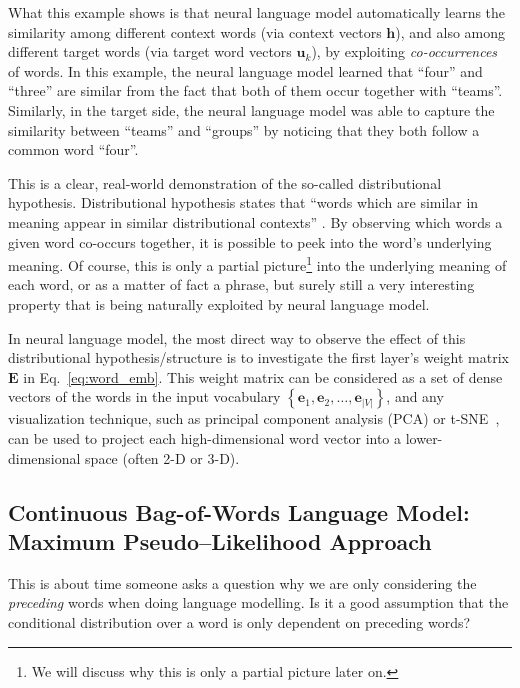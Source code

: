\documentclass{report}
\newcommand{\vect}[1]{\mathbf{#1}}
\newcommand{\matr}[1]{\mathbf{#1}}
\newcommand{\ve}[0]{\vect{e}}
\newcommand{\vh}[0]{\vect{h}}
\newcommand{\vu}[0]{\vect{u}}
\newcommand{\mE}[0]{\matr{E}}
\newcommand{\alert}[1]{\textcolor{red}{#1}}
\begin{document}
What this example shows is that neural language model automatically learns the
similarity among different context words (via context vectors $\vh$), and also among
different target words (via target word vectors $\vu_k$), by exploiting {\em
co-occurrences} of words. In this example, the neural language model learned
that ``four'' and ``three'' are similar from the fact that both of them occur
together with ``teams''. Similarly, in the target side, the neural language
model was able to capture the similarity between ``teams'' and ``groups'' by
noticing that they both follow a common word ``four''.

This is a clear, real-world demonstration of the so-called distributional
hypothesis. Distributional hypothesis states that ``words which are similar in
meaning appear in similar distributional contexts'' \cite{firth1957}. By
observing which words a given word co-occurs together, it is possible to peek
into the word's underlying meaning. Of course, this is only a partial
picture\footnote{
    We will discuss why this is only a partial picture later on.
}
into the underlying meaning of each word, or as a matter of fact a phrase, but
surely still a very interesting property that is being naturally exploited by
neural language model.

In neural language model, the most direct way to observe the effect of this
distributional hypothesis/structure is to investigate the first layer's weight
matrix $\mE$ in Eq.~\eqref{eq:word_emb}. This weight matrix can be considered as
a set of dense vectors of the words in the input vocabulary $\left\{ \ve_1,
\ve_2, \ldots, \ve_{|V|}\right\}$, and any visualization technique, such as
principal component analysis (PCA) or t-SNE~\cite{VanDerMaaten08}, can be used
to project each high-dimensional word vector into a lower-dimensional space
(often 2-D or 3-D). 

%


\subsection{Continuous Bag-of-Words Language Model: Maximum Pseudo--Likelihood
Approach}

This is about time someone asks a question why we are only considering the {\em
preceding} words when doing language modelling. Is it a good assumption that the
conditional distribution over a word is only dependent on preceding words? 
\end{document}
